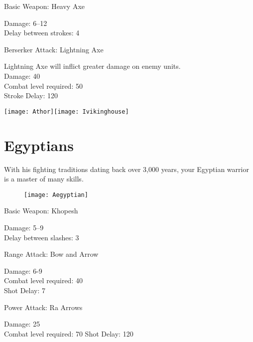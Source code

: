 Basic Weapon: Heavy Axe
\begin{adjustwidth}{1cm}{}
	Damage: 6–12 \\
	Delay between strokes: 4
\end{adjustwidth}
Berserker Attack: Lightning Axe
\begin{adjustwidth}{1cm}{}
	Lightning Axe will inflict greater damage on enemy units. \\
	Damage: 40 \\
	Combat level required: 50 \\
	Stroke Delay: 120 
\end{adjustwidth}

\begin{center}
	\texttt{[image: Athor]}\hspace{1pt}\texttt{[image: Ivikinghouse]}
\end{center}

\clearpage

\section{Egyptians}


With his fighting traditions dating back over 3,000 years, your Egyptian warrior is a master of many skills.

\begin{wrapfigure}{r}{0.5\textwidth}
	\begin{center}
		\vspace{-20pt}
		\texttt{[image: Aegyptian]}
	\end{center}
	\vspace{-20pt}
\end{wrapfigure}

Basic Weapon: Khopesh
\begin{adjustwidth}{1cm}{}
	Damage: 5–9 \\
	Delay between slashes: 3
	\end{adjustwidth}
Range Attack: Bow and Arrow
\begin{adjustwidth}{1cm}{}
	Damage: 6-9 \\
	Combat level required: 40 \\
	Shot Delay: 7
\end{adjustwidth}
Power Attack: Ra Arrows
\begin{adjustwidth}{1cm}{}
	Damage: 25 \\
	Combat level required: 70
	Shot Delay: 120 \\
\end{adjustwidth}

